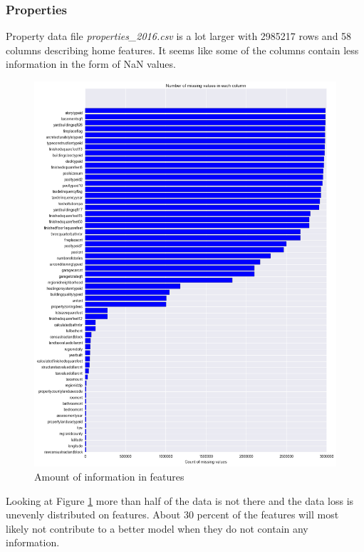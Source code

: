 \documentclass[a4paper]{article}
\begin{document}
\subsubsection{Properties}
Property data file \textit{properties\_2016.csv} is a lot larger with 2985217 rows and 58 columns describing home
features. It seems like some of the columns contain less information in the form of NaN values.
\begin{figure}
\centering
\includegraphics[width=1\textwidth]{./img/prop-nan.png}
\caption{\label{fig:prop-nan} Amount of information in features}
\end{figure}
Looking at Figure \ref{fig:prop-nan} more than half of the data is not there and the
data loss is unevenly distributed on features. About 30 percent of the features will
most likely not contribute to a better model when they do not contain any information.
\end{document}
